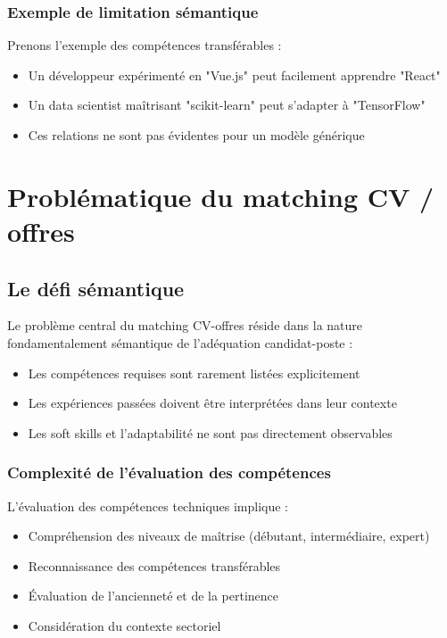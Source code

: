 \documentclass[12pt,a4paper]{report}
\begin{document}
\subsubsection{Exemple de limitation sémantique}

Prenons l'exemple des compétences transférables :
\begin{itemize}
\item Un développeur expérimenté en "Vue.js" peut facilement apprendre "React"
\item Un data scientist maîtrisant "scikit-learn" peut s'adapter à "TensorFlow"
\item Ces relations ne sont pas évidentes pour un modèle générique
\end{itemize}

\section{Problématique du matching CV / offres}

\subsection{Le défi sémantique}

Le problème central du matching CV-offres réside dans la nature fondamentalement sémantique de l'adéquation candidat-poste :
\begin{itemize}
\item Les compétences requises sont rarement listées explicitement
\item Les expériences passées doivent être interprétées dans leur contexte
\item Les soft skills et l'adaptabilité ne sont pas directement observables
\end{itemize}

\subsubsection{Complexité de l'évaluation des compétences}

L'évaluation des compétences techniques implique :
\begin{itemize}
\item Compréhension des niveaux de maîtrise (débutant, intermédiaire, expert)
\item Reconnaissance des compétences transférables
\item Évaluation de l'ancienneté et de la pertinence
\item Considération du contexte sectoriel
\end{itemize}
\end{document}
